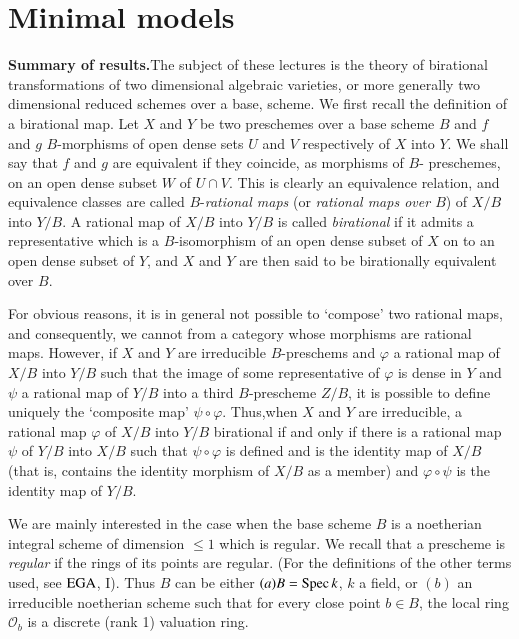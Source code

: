 \chapter{Minimal models}\label{chap1}%


\textbf{Summary of results.}\pageoriginale The subject of these lectures is the
theory of birational transformations of two dimensional algebraic
varieties, or more generally two dimensional reduced schemes over a
base, scheme. We first recall the definition of a birational map. Let
$X$ and $Y$ be two preschemes over a base scheme $B$ and $f$ and $g$
$B$-morphisms of open dense sets $U$ and $V$ respectively of $X$ into
$Y$. We shall say that $f$ and $g$ are equivalent if they coincide, as
morphisms of $B$- preschemes, on an open dense subset $W$ of $U \cap
V$. This is clearly  an equivalence relation, and equivalence classes
are called  $B$-\textit{rational maps} (or \textit{rational maps over
  $B$}) of $X/B$ into $Y/B$. A rational map of $X/B$ into $Y/B$ is
called \textit{birational} if it admits a representative which is a
$B$-isomorphism of an open dense subset of $X$ on to an open dense
subset of $Y$, and $X$ and $Y$ are then said to be birationally
equivalent over $B$. 

For obvious reasons, it is in general not possible to `compose' two
rational maps, and consequently, we cannot from a category whose
morphisms are rational maps. However, if $X$ and  $Y$ are irreducible
$B$-pre\-schems and $\varphi$ a rational map of $X/B$  into $Y/B$ such
that the image of some representative of $\varphi$ is dense in $Y$ and
$\psi$ a rational map of $Y/B$ into a third $B$-prescheme $Z/B$, it is
possible to define uniquely the `composite map' $\psi \circ \varphi$.
Thus,\pageoriginale when $X$ and $Y$ are irreducible, a rational map
$\varphi$ of $X/B$ 
into $Y/B$ birational if and only if there is a rational map $\psi$ of
$Y/B$ into $X/B$ such that $\psi \circ \varphi$ is defined and is the
identity map of $X/B$ (that is, contains the identity morphism of
$X/B$ as a member) and $\varphi \circ \psi$ is the identity map of $Y/B$.   

We are mainly interested in the case when the base scheme $B$ is a
noetherian integral scheme of dimension $\leq 1$ which is regular. We
recall that a prescheme is \textit{regular} if the rings of its points
are regular. (For the definitions of the other terms used, see $\operatorname{EGA}$,
I). Thus $B$ can be either $(a) B = \operatorname{Spec} k$, $k$ a field, or $(b)$
an irreducible noetherian scheme such that for every close point $ b
\in B$, the local ring $\mathscr{O}_b$ is a discrete (rank 1)
valuation ring. 


